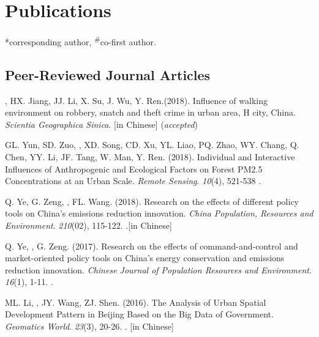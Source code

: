 \newcommand{\Revision}{\textit{under revision}}
\newcommand{\Review}{\textit{under review}}
\newcommand{\CS}{*} %
\newcommand{\CF}{\textsuperscript{\#}} %

\section*{Publications}
\CS corresponding author, \CF co-first author.

\subsection*{Peer-Reviewed Journal Articles}
\begin{etaremune}
\item
    \Shaoqing, HX. Jiang, JJ. Li, X. Su, J. Wu, Y. Ren.(2018).
	Influence of walking environment on robbery, snatch and theft crime in urban area, H city, China.
    \textit{Scientia Geographica Sinica}. [in Chinese]
    (\textit{accepted}) 
\item
    GL. Yun, SD. Zuo, \Shaoqing, XD. Song, CD. Xu, YL. Liao, PQ. Zhao, WY. Chang, Q. Chen, YY. Li, JF. Tang, W. Man, Y. Ren. (2018).
	Individual and Interactive Influences of Anthropogenic and Ecological Factors on Forest PM2.5 Concentrations at an Urban Scale.
    \textit{Remote Sensing}. \textit{10}(4), 521-538
    .
\item
    Q. Ye, G. Zeng, \Shaoqing, FL. Wang. (2018).
	Research on the effects of different policy tools on China’s emissions reduction innovation.
    \textit{China Population, Resources and Environment}. \textit{210}(02), 115-122.
    .[in Chinese]
\item
    Q. Ye, \Shaoqing, G. Zeng. (2017).
	Research on the effects of command-and-control and market-oriented policy tools on China’s energy conservation and emissions reduction innovation.
    \textit{Chinese Journal of Population Resources and Environment}. \textit{16}(1), 1-11.
    .
\item
    ML. Li, \Shaoqing, JY. Wang, ZJ. Shen. (2016).
	The Analysis of Urban Spatial Development Pattern in Beijing Based on the Big Data of Government.
    \textit{Geomatics World}. \textit{23}(3), 20-26.
    . [in Chinese]
\end{etaremune}

